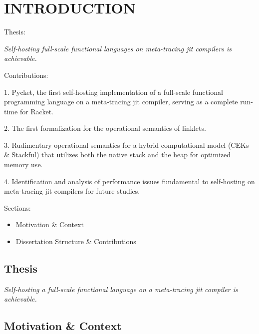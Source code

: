 \chapter[\texorpdfstring{INTRODUCTION}
                          {1. Introduction}]{INTRODUCTION}
    \label{chapter:introduction}

    \begin{chaptersynopsis}
        \footnotesize

       Thesis:

        \textit{Self-hosting full-scale functional languages on meta-tracing \gls{jit} compilers is achievable.}

        \vspace{2em}

        Contributions:

        1. Pycket, the first self-hosting implementation of a full-scale functional programming language on a meta-tracing \gls{jit} compiler, serving as a complete run-time for Racket.

        2. The first formalization for the operational semantics of linklets.

        3. Rudimentary operational semantics for a hybrid computational model (CEKs \& Stackful) that utilizes both the native stack and the heap for optimized memory use.

        4. Identification and analysis of performance issues fundamental to self-hosting on meta-tracing \gls{jit} compilers for future studies.

        \vspace{2em}

        Sections:
		\begin{itemize}
			\item Motivation \& Context
			\item Dissertation Structure \& Contributions
		\end{itemize}
    \end{chaptersynopsis}

    \section{Thesis}

    \textit{Self-hosting a full-scale functional language on a meta-tracing \gls{jit} compiler is achievable.}

    \section[\texorpdfstring{Motivation \& Context}{Context}]{Motivation \& Context}

